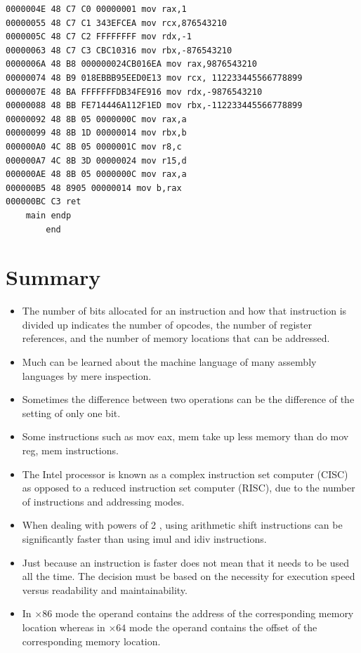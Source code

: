 \documentclass[10pt]{book}
\begin{document}
\begin{verbatim}
0000004E 48 C7 C0 00000001 mov rax,1
00000055 48 C7 C1 343EFCEA mov rcx,876543210
0000005C 48 C7 C2 FFFFFFFF mov rdx,-1
00000063 48 C7 C3 CBC10316 mov rbx,-876543210
0000006A 48 B8 000000024CB016EA mov rax,9876543210
00000074 48 B9 018EBBB95EED0E13 mov rcx, 112233445566778899
0000007E 48 BA FFFFFFFDB34FE916 mov rdx,-9876543210
00000088 48 BB FE714446A112F1ED mov rbx,-112233445566778899
00000092 48 8B 05 0000000C mov rax,a
00000099 48 8B 1D 00000014 mov rbx,b
000000A0 4C 8B 05 0000001C mov r8,c
000000A7 4C 8B 3D 00000024 mov r15,d
000000AE 48 8B 05 0000000C mov rax,a
000000B5 48 8905 00000014 mov b,rax
000000BC C3 ret
    main endp
        end
\end{verbatim}

\section{Summary}
\begin{itemize}
  \item The number of bits allocated for an instruction and how that instruction is divided up indicates the number of opcodes, the number of register references, and the number of memory locations that can be addressed.
  \item Much can be learned about the machine language of many assembly languages by mere inspection.
  \item Sometimes the difference between two operations can be the difference of the setting of only one bit.
  \item Some instructions such as mov eax, mem take up less memory than do mov reg, mem instructions.
  \item The Intel processor is known as a complex instruction set computer (CISC) as opposed to a reduced instruction set computer (RISC), due to the number of instructions and addressing modes.
  \item When dealing with powers of 2 , using arithmetic shift instructions can be significantly faster than using imul and idiv instructions.
  \item Just because an instruction is faster does not mean that it needs to be used all the time. The decision must be based on the necessity for execution speed versus readability and maintainability.
  \item In $\times 86$ mode the operand contains the address of the corresponding memory location whereas in $\times 64$ mode the operand contains the offset of the corresponding memory location.
\end{itemize}
\end{document}

